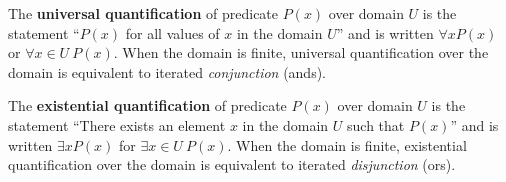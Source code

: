 
The {\bf universal quantification} of predicate $P(x)$ over
domain $U$ is the statement ``$P(x)$ for all values of $x$ in the domain $U$''
and is written $\forall x P(x)$ or $\forall x \in U ~P(x)$. 
When the domain is finite, universal quantification over the domain 
is equivalent to iterated {\it conjunction} (ands).

The {\bf existential quantification} of predicate $P(x)$ 
over domain $U$ is the statement ``There exists an element $x$ 
in the domain $U$ such that $P(x)$'' and is written $\exists x P(x)$
for $\exists x \in U ~P(x)$. 
When the domain is finite, existential quantification over the domain 
is equivalent to iterated {\it disjunction} (ors).
